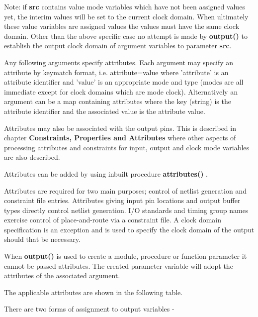         Note: if {\bf src} contains value mode variables which have not been
        assigned values yet, the interim values will be set to the current clock
        domain. When ultimately these value variables are assigned values the
        values must have the same clock domain. Other than the above specific
        case no attempt is made by {\bf output()} to establish the output clock
        domain of argument variables to parameter {\bf src}.      
        
        Any following arguments specify attributes. Each argument may specify an
        attribute by keymatch format, i.e. attribute=value where 'attribute' is
        an attribute identifier and 'value' is an appropriate mode and type
        (modes are all immediate except for clock domains which are mode clock).
        Alternatively an argument can be a map containing attributes where the
        key (string) is the attribute identifier and the associated value is
        the attribute value.

        Attributes may also be associated with the output pins. This is described
        in chapter  {\bf Constraints, Properties and
        Attributes} where other aspects of processing attributes and constraints
        for input, output and clock mode variables are also described.

        Attributes can be added by using inbuilt procedure {\bf attributes()}
        .             
        
        Attributes are required for two main purposes; control of netlist
        generation and constraint file entries. Attributes giving input pin
        locations and output buffer types directly control netlist generation.
        I/O standards and timing group names exercise control of place-and-route
        via a constraint file. A clock domain specification is an exception and
        is used to specify the clock domain of the output should that be necessary.
        
        When {\bf output()} is used to create a module, procedure or function
        parameter it cannot be passed attributes. The created parameter variable
        will adopt the attributes of the associated argument.
        
        The applicable attributes are shown in the following table.

        

        There are two forms of assignment to output variables -
        
